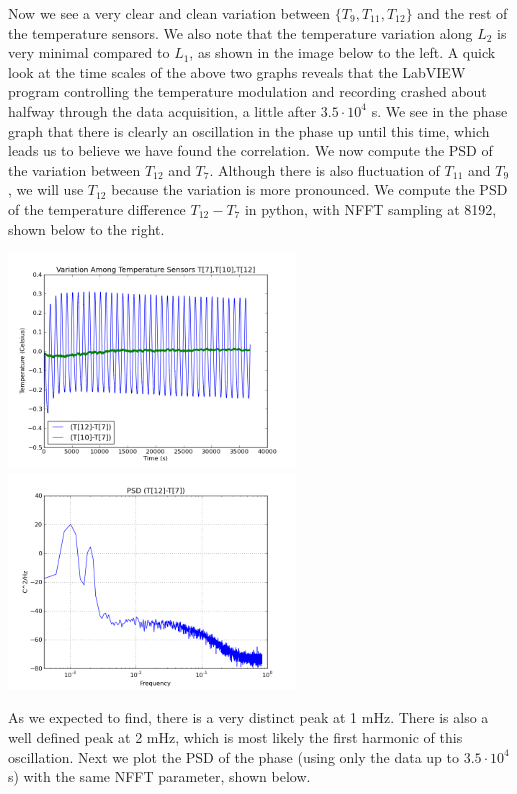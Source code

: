 \documentclass[11 pt]{article}
\begin{document}
Now we see a very clear and clean variation between $\{T_{9},T_{11},T_{12}\}$ and the rest of the temperature sensors. We also note that the temperature variation along $L_2$ is very minimal compared to $L_1$, as shown in the image below to the left. A quick look at the time scales of the above two graphs reveals that the LabVIEW program controlling the temperature modulation and recording crashed about halfway through the data acquisition, a little after $3.5\cdot 10^4$ s. We see in the phase graph that there is clearly an oscillation in the phase up until this time, which leads us to believe we have found the correlation.
We now compute the PSD of the variation between $T_{12}$ and $T_7$. Although there is also fluctuation of $T_{11}$ and $T_9$, we will use $T_{12}$ because the variation is more pronounced. We compute the PSD of the temperature difference $T_{12}-T_{7}$ in python, with NFFT sampling at 8192, shown below to the right.
\begin{center}\includegraphics[width=3in]{Tempmoddiff_7-10-12.png}\includegraphics[width=3in]{PSD_mod12-7.png}\\\end{center} As we expected to find, there is a very distinct peak at 1 mHz. There is also a well defined peak at 2 mHz, which is most likely the first harmonic of this oscillation. Next we plot the PSD of the phase (using only the data up to $3.5\cdot 10^4$ s) with the same NFFT parameter, shown below.
\end{document}
